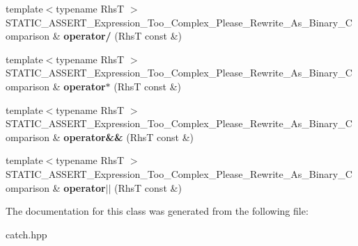 \begin{DoxyCompactItemize}
\mbox{\label{class_catch_1_1_expression_lhs_a37d50565046ac9b1c9159a7c0cf88a1e}} 
{\footnotesize template$<$typename RhsT $>$ }\\S\+T\+A\+T\+I\+C\+\_\+\+A\+S\+S\+E\+R\+T\+\_\+\+Expression\+\_\+\+Too\+\_\+\+Complex\+\_\+\+Please\+\_\+\+Rewrite\+\_\+\+As\+\_\+\+Binary\+\_\+\+Comparison \& {\bfseries operator/} (RhsT const \&)
\item 
\mbox{\label{class_catch_1_1_expression_lhs_a9a94294c22449f62087862ef911e6291}} 
{\footnotesize template$<$typename RhsT $>$ }\\S\+T\+A\+T\+I\+C\+\_\+\+A\+S\+S\+E\+R\+T\+\_\+\+Expression\+\_\+\+Too\+\_\+\+Complex\+\_\+\+Please\+\_\+\+Rewrite\+\_\+\+As\+\_\+\+Binary\+\_\+\+Comparison \& {\bfseries operator$\ast$} (RhsT const \&)
\item 
\mbox{\label{class_catch_1_1_expression_lhs_acbda1f937f8bd5b9da649626cc0b0f54}} 
{\footnotesize template$<$typename RhsT $>$ }\\S\+T\+A\+T\+I\+C\+\_\+\+A\+S\+S\+E\+R\+T\+\_\+\+Expression\+\_\+\+Too\+\_\+\+Complex\+\_\+\+Please\+\_\+\+Rewrite\+\_\+\+As\+\_\+\+Binary\+\_\+\+Comparison \& {\bfseries operator\&\&} (RhsT const \&)
\item 
\mbox{\label{class_catch_1_1_expression_lhs_a6932b72da79d6c6b03d867772ceac61b}} 
{\footnotesize template$<$typename RhsT $>$ }\\S\+T\+A\+T\+I\+C\+\_\+\+A\+S\+S\+E\+R\+T\+\_\+\+Expression\+\_\+\+Too\+\_\+\+Complex\+\_\+\+Please\+\_\+\+Rewrite\+\_\+\+As\+\_\+\+Binary\+\_\+\+Comparison \& {\bfseries operator$\vert$$\vert$} (RhsT const \&)
\end{DoxyCompactItemize}


The documentation for this class was generated from the following file\+:\begin{DoxyCompactItemize}
\item 
catch.\+hpp\end{DoxyCompactItemize}
